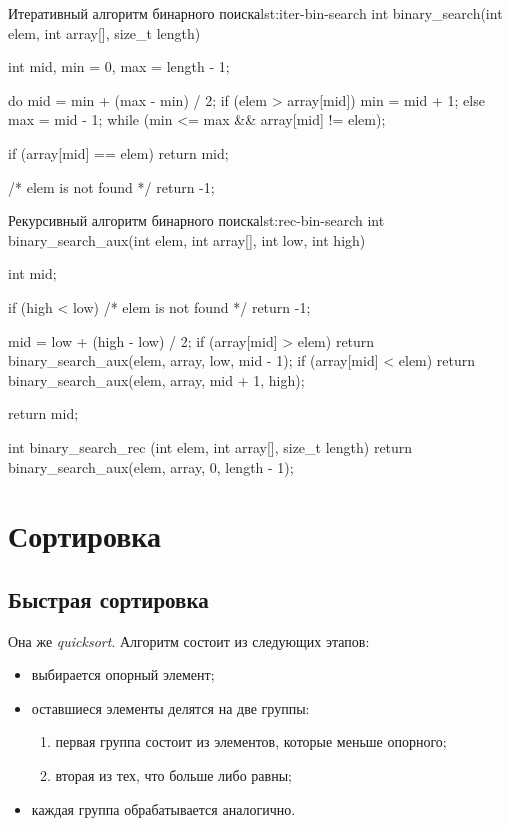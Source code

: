 \begin{clst}{Итеративный алгоритм бинарного поиска}{lst:iter-bin-search}
int binary_search(int elem, int array[], size_t length)
{
    int mid, min = 0, max = length - 1;

    do {
        mid = min + (max - min) / 2;
        if (elem > array[mid])
            min = mid + 1;
        else
            max = mid - 1;
    } while (min <= max && array[mid] != elem);

    if (array[mid] == elem)
        return mid;

    /* elem is not found */
    return -1;
}
\end{clst}

\begin{clst}{Рекурсивный алгоритм бинарного поиска}{lst:rec-bin-search}
int binary_search_aux(int elem, int array[], int low, int high)
{
    int mid;

    if (high < low)
        /* elem is not found */
        return -1;

    mid = low + (high - low) / 2;
    if (array[mid] > elem)
        return binary_search_aux(elem, array, low, mid - 1);
    if (array[mid] < elem)
        return binary_search_aux(elem, array, mid + 1, high);

    return mid;
}

int binary_search_rec (int elem, int array[], size_t length)
{
    return binary_search_aux(elem, array, 0, length - 1);
}
\end{clst}

\section{Сортировка}
\label{sec:sorting}

\subsection{Быстрая сортировка}

Она же \emph{quicksort}. Алгоритм состоит из следующих этапов:
\begin{itemize}
  \item выбирается опорный элемент;
  \item оставшиеся элементы делятся на две группы:
    \begin{enumerate}
      \item первая группа состоит из элементов, которые меньше опорного;
      \item вторая из тех, что больше либо равны;
    \end{enumerate}
  \item каждая группа обрабатывается аналогично.
\end{itemize}

